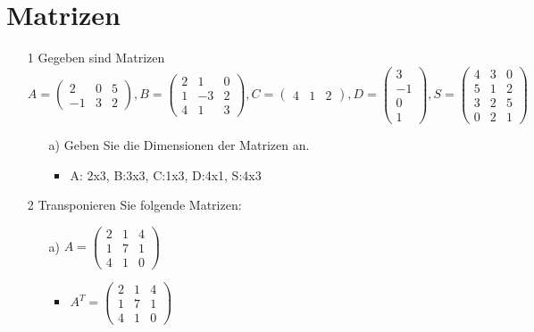 \documentclass{article}
\begin{document}
	\section{Matrizen}
	\begin{itemize}
		\item[1]{Gegeben sind Matrizen $A=\begin{pmatrix} 2 & 0 & 5 \\ -1 & 3 & 2 \end{pmatrix}, B=\begin{pmatrix} 2 & 1 & 0 \\ 1 & -3 & 2 \\ 4 & 1 & 3 \end{pmatrix}, C=\begin{pmatrix} 4 & 1 & 2 \end{pmatrix}, D=\begin{pmatrix} 3 \\ -1 \\ 0 \\ 1 \end{pmatrix}, S=\begin{pmatrix} 4 & 3 & 0 \\ 5 & 1 & 2 \\ 3 & 2 & 5 \\ 0 & 2 & 1 \end{pmatrix}$}
		\begin{itemize}
			\item[a)]{Geben Sie die Dimensionen der Matrizen an.}
			\begin{itemize}
				\item{A: 2x3, B:3x3, C:1x3, D:4x1, S:4x3}
			\end{itemize}
		\end{itemize}
		\item[2]{Transponieren Sie folgende Matrizen:}
		\begin{itemize}
			\item[a)]{$A=\begin{pmatrix} 2 & 1 & 4 \\ 1 & 7 & 1 \\ 4 & 1 & 0 \end{pmatrix}$}
			\begin{itemize}
				\item{$A^T=\begin{pmatrix} 2 & 1 & 4 \\ 1 & 7 & 1 \\ 4 & 1 & 0 \end{pmatrix}$}
			\end{itemize}

\end{itemize}
\end{itemize}
\end{document}
